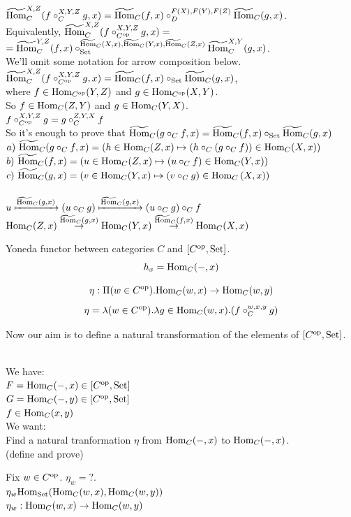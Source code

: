 \documentclass[10pt,a4paper]{article}
\begin{document}
\begin{enumerate}
$\HomMor_C^{X,Z}(f\circ_C^{X,Y,Z} g, x)=\HomMor_C(f,x)\circ_D^{F(X),F(Y),F(Z)} \HomMor_C(g,x)$.\\
Equivalently, $\HomMor_C^{X,Z}(f\circ_{C^\op}^{X,Y,Z} g, x)=$\\ $=\HomMor_C^{Y,Z}(f,x)\circ_\Set^{\HomMor_C(X,x),\HomMor_C(Y,x),\HomMor_C(Z,x)} \HomMor_C^{X,Y}(g,x)$.\\
We'll omit some notation for arrow composition below.\\
$\HomMor_C^{X,Z}(f\circ_{C^\op}^{X,Y,Z} g, x)=\HomMor_C(f,x)\circ_\Set \HomMor_C(g,x)$,\\
where $f\in\Hom_{C^\op}(Y,Z)$ and $g\in\Hom_{C^\op}(X,Y)$.\\
So $f\in\Hom_{C}(Z,Y)$ and $g\in\Hom_{C}(Y,X)$.\\
$f\circ_{C^\op}^{X,Y,Z} g = g\circ_{C}^{Z,Y,X} f$\\
So it's enough to prove that $\HomMor_C(g\circ_C f, x) = \HomMor_C(f, x) \circ_\Set \HomMor_C(g, x)$\\
$a)\ \HomMor_C(g\circ_C f, x) = (h \in\Hom_C(Z,x) \mapsto (h \circ_C (g\circ_C f))\in\Hom_C(X,x))$\\
$b)\ \HomMor_C(f, x) = \left(u \in\Hom_C(Z,x) \mapsto (u \circ_C f)\in\Hom_C(Y,x)\right)$\\
$c)\ \HomMor_C(g, x) = \left(v \in\Hom_C(Y,x) \mapsto (v \circ_C g)\in\Hom_C\left(X,x\right)\right)$\\
\\
$u \xmapsto{\HomMor_C(g, x)} (u \circ_C g)\xmapsto{\HomMor_C(g, x)} (u \circ_C g) \circ_C f$
\\
$\Hom_C(Z,x) \stackrel{\HomMor_C(g, x)}{\to} \Hom_C(Y,x)\stackrel{\HomMor_C(f, x)}{\to} \Hom_C(X,x)$
\\
\end{enumerate}
\myqed
\begin{definition}
Yoneda functor between categories $C$ and $[C^\op,\Set]$.
$$h_x = \Hom_C(-, x)$$
\end{definition}


\begin{definition}
$$\eta : \Pi(w\in C^\op).\Hom_C(w,x)\to \Hom_C(w,y)$$
$$\eta = \lambda (w\in C^\op). \lambda g\in\Hom_C(w,x).(f\circ_C^{w,x,y} g)$$
\end{definition}
Now our aim is to define a natural transformation of the elements of $[C^\op,\Set]$.\\
\begin{lemma}$\textrm{ }$\\
We have:\\
$F=\Hom_C(-,x)\in [C^\op,\Set]$\\
$G=\Hom_C(-,y)\in [C^\op,\Set]$\\
$f\in\Hom_C(x,y)$\\
We want:\\
Find a natural tranformation $\eta$ from $\Hom_C(-,x)$ to $\Hom_C(-,x)$.\\ (define and prove)\\
\end{lemma}
Fix $w\in C^\op$. $\eta_w = ?$.\\
$\eta_w\Hom_\Set(\Hom_C(w,x),\Hom_C(w,y))$\\
$\eta_w: \Hom_C(w,x)\to \Hom_C(w,y)$\\
\end{document}
